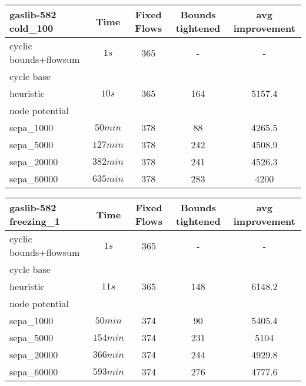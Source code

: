 \begin{center}
\begin{tabular}{ l | c | c | c | c }

\textbf{gaslib-582 cold\_100} & Time  & Fixed Flows & Bounds tightened & avg improvement\\
\hline
 cyclic bounds+flowsum& $1s$ & 365 & - & -  \\
 cycle base& $ $ &  &  & \\
 heuristic& $ 10s $& 365& 164 & 5157.4\\
 node potential& $ $ &  &  &   \\ 
 sepa\_1000& $50 min $ & 378 & 88 & 4265.5 \\
 sepa\_5000& $ 127 min$ & 378 & 242 & 4508.9  \\
 sepa\_20000& $ 382 min$ &  378& 241 & 4526.3  \\
 sepa\_60000& $635 min $ & 378& 283& 4200\\
\end{tabular} 
\end{center}

\begin{center}
\begin{tabular}{ l | c | c | c | c }

\textbf{gaslib-582 freezing\_1} & Time  & Fixed Flows & Bounds tightened & avg improvement\\
\hline
 cyclic bounds+flowsum& $1s$ & 365 & - & - \\
 cycle base& $ $ &  &  & \\
 heuristic& $ 11s$& 365& 148 & 6148.2\\
 node potential& $ $ &  &  &  \\ 
 sepa\_1000& $50 min $ & 374 & 90 & 5405.4 \\
 sepa\_5000& $ 154 min$ & 374 & 231 &5104  \\
 sepa\_20000& $366 min $ & 374 & 244 &4929.8 \\
 sepa\_60000& $593 min $ & 374& 276& 4777.6\\
\end{tabular} 
\end{center}

